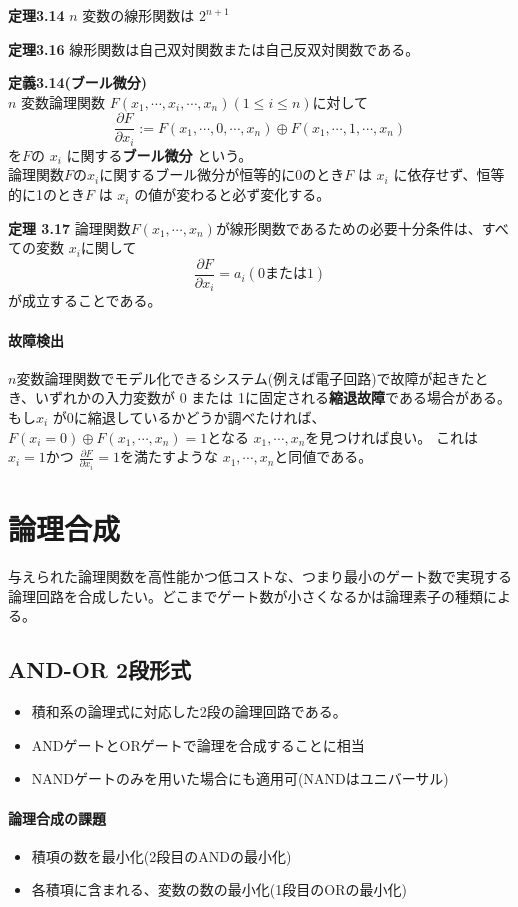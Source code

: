 \documentclass[a4j,10pt,oneside,openany,fleqn]{jsbook}
\begin{document}
\textbf{定理3.14}
$n$ 変数の線形関数は $2^{n+1}$

\textbf{定理3.16}
線形関数は自己双対関数または自己反双対関数である。

\textbf{定義3.14(ブール微分)}\\
$n$ 変数論理関数 $F(x_1, \cdots, x_i,\cdots ,x_n) (1 \leq i \leq n)$に対して
\[
\frac{\partial F}{\partial x_i} := F(x_1,\cdots, 0, \cdots, x_n) \oplus F(x_1,\cdots, 1, \cdots, x_n)
\]
を$F$の $x_i$ に関する\textbf{ブール微分} という。\\
論理関数$F$の$x_i$に関するブール微分が恒等的に0のとき$F$ は $x_i$ に依存せず、恒等的に1のとき$F$ は $x_i$ の値が変わると必ず変化する。

\textbf{定理 3.17}
論理関数$F(x_1, \cdots, x_n)$が線形関数であるための必要十分条件は、すべての変数 $x_i$に関して
\[
\frac{\partial F}{\partial x_i} = a_i (\textrm{0または1})
\]
が成立することである。


\subsubsection{故障検出}
$n$変数論理関数でモデル化できるシステム(例えば電子回路)で故障が起きたとき、いずれかの入力変数が 0 または 1に固定される\textbf{縮退故障}である場合がある。
もし$x_i$ が0に縮退しているかどうか調べたければ、 $F(x_i = 0) \oplus F(x_1, \cdots, x_n) = 1$となる $x_1, \cdots, x_n$を見つければ良い。
これは $x_i = 1$かつ $\frac{\partial F}{\partial x_i} = 1$を満たすような $x_1, \cdots, x_n$と同値である。

\chapter{論理合成}
与えられた論理関数を高性能かつ低コストな、つまり最小のゲート数で実現する論理回路を合成したい。どこまでゲート数が小さくなるかは論理素子の種類による。

\section{AND-OR 2段形式}
\begin{itemize}
\item 積和系の論理式に対応した2段の論理回路である。
\item ANDゲートとORゲートで論理を合成することに相当
\item NANDゲートのみを用いた場合にも適用可(NANDはユニバーサル)
\end{itemize}

\subsubsection{論理合成の課題}
\begin{itemize}
\item 積項の数を最小化(2段目のANDの最小化)
\item 各積項に含まれる、変数の数の最小化(1段目のORの最小化)
\end{itemize}
\end{document}
